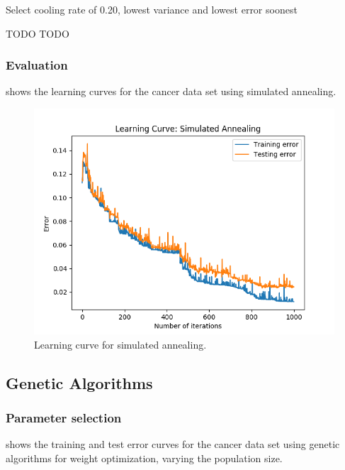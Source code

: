 \documentclass{article}
\begin{document}
        Select cooling rate of 0.20, lowest variance and lowest error soonest

        TODO TODO

      \subsubsection{Evaluation}
         shows the learning curves for the cancer data set using simulated annealing.

        \begin{figure}[htb]
        \centering
        \includegraphics[width=.5\linewidth]{out/plot/SA.png}
        \caption{Learning curve for simulated annealing.}
        \label{fig:sa-learning}
        \end{figure}

    \subsection{Genetic Algorithms}

      \subsubsection{Parameter selection}
         shows the training and test error curves for the cancer data set using genetic algorithms for weight optimization, varying the population size.
\end{document}
